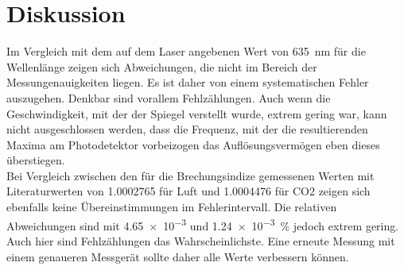 \section{Diskussion}
Im Vergleich mit dem auf dem Laser angebenen Wert von \SI{635}{\nano\metre} für die
Wellenlänge zeigen sich Abweichungen, die nicht im Bereich der Messungenauigkeiten liegen.
Es ist daher von einem systematischen Fehler auszugehen. Denkbar sind vorallem
Fehlzählungen. Auch wenn die Geschwindigkeit, mit der der Spiegel verstellt wurde,
extrem gering war, kann nicht ausgeschlossen werden, dass die Frequenz, mit der
die resultierenden Maxima am Photodetektor vorbeizogen das Auflösungsvermögen eben
dieses überstiegen.\\
Bei Vergleich zwischen den für die Brechungsindize gemessenen Werten mit Literaturwerten
von \num{1.0002765}\cite{luft} für Luft und \num{1.0004476}\cite{co2} für CO2 zeigen
sich ebenfalls keine Übereinstimmungen im Fehlerintervall. Die relativen Abweichungen
sind mit \num{4.65e-3} und \SI{1.24e-3}{\percent} jedoch extrem gering. Auch hier sind
Fehlzählungen das Wahrscheinlichste. Eine erneute Messung mit einem genaueren Messgerät
sollte daher alle Werte verbessern können.
\newpage
\nocite{*}
\printbibliography
